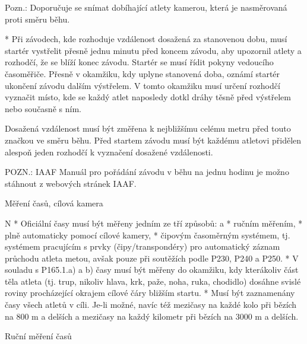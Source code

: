 Pozn.: Doporučuje se snímat dobíhající atlety kamerou, která je nasměrovaná proti směru běhu.

* Při závodech, kde rozhoduje vzdálenost dosažená za stanovenou dobu, musí startér vystřelit přesně jednu minutu před koncem závodu, aby upozornil atlety a rozhodčí, že se blíží konec závodu. Startér se musí řídit pokyny vedoucího časoměřiče. Přesně v okamžiku, kdy uplyne stanovená doba, oznámí startér ukončení závodu dalším výstřelem. V tomto okamžiku musí určení rozhodčí vyznačit místo, kde se každý atlet naposledy dotkl dráhy těsně před výstřelem nebo současně s ním.

Dosažená vzdálenost musí být změřena k nejbližšímu celému metru před touto značkou ve směru běhu. Před startem závodu musí být každému atletovi přidělen alespoň jeden rozhodčí k vyznačení dosažené vzdálenosti.

POZN.: IAAF Manuál pro pořádání závodu v běhu na jednu hodinu je možno stáhnout z webových stránek IAAF.
\enditems

\secc Měření časů, cílová kamera

\begitems \style N
* Oficiální časy musí být měřeny jedním ze tří způsobů:
  \begitems \style a
  * ručním měřením,
  * plně automaticky pomocí cílové kamery,
  * čipovým časoměrným systémem, tj. systémem pracujícím s prvky (čipy/transpondéry) pro automatický záznam průchodu atleta metou, avšak pouze při soutěžích podle P230, P240 a P250.
  \enditems
* V souladu s P165.1.a) a b) časy musí být měřeny do okamžiku, kdy kterákoliv část těla atleta (tj. trup, nikoliv hlava, krk, paže, noha, ruka, chodidlo) dosáhne svislé roviny procházející okrajem cílové čáry bližším startu.
* Musí být zaznamenány časy všech atletů v cíli. Je-li možné, navíc též mezičasy na každé kolo při bězích na 800 m a delších a mezičasy na každý kilometr při bězích na 3000 m a delších.

Ruční měření časů

